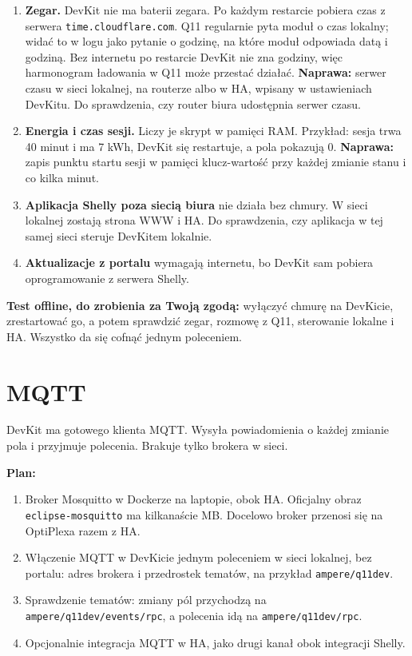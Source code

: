 \documentclass[11pt,a4paper]{article}
\begin{document}
\begin{enumerate}
\item \textbf{Zegar.} DevKit nie ma baterii zegara. Po każdym restarcie pobiera czas z serwera \texttt{time.\allowbreak{}cloudflare.\allowbreak{}com}. Q11 regularnie pyta moduł o czas lokalny; widać to w logu jako pytanie o godzinę, na które moduł odpowiada datą i godziną. Bez internetu po restarcie DevKit nie zna godziny, więc harmonogram ładowania w Q11 może przestać działać. \textbf{Naprawa:} serwer czasu w sieci lokalnej, na routerze albo w HA, wpisany w ustawieniach DevKitu. Do sprawdzenia, czy router biura udostępnia serwer czasu.
\item \textbf{Energia i czas sesji.} Liczy je skrypt w pamięci RAM. Przykład: sesja trwa 40 minut i ma 7 kWh, DevKit się restartuje, a pola pokazują 0. \textbf{Naprawa:} zapis punktu startu sesji w pamięci klucz-wartość przy każdej zmianie stanu i co kilka minut.
\item \textbf{Aplikacja Shelly poza siecią biura} nie działa bez chmury. W sieci lokalnej zostają strona WWW i HA. Do sprawdzenia, czy aplikacja w tej samej sieci steruje DevKitem lokalnie.
\item \textbf{Aktualizacje z portalu} wymagają internetu, bo DevKit sam pobiera oprogramowanie z serwera Shelly.
\end{enumerate}

\textbf{Test offline, do zrobienia za Twoją zgodą:} wyłączyć chmurę na DevKicie, zrestartować go, a potem sprawdzić zegar, rozmowę z Q11, sterowanie lokalne i HA. Wszystko da się cofnąć jednym poleceniem.


\clearpage

\section{MQTT}

DevKit ma gotowego klienta MQTT. Wysyła powiadomienia o każdej zmianie pola i przyjmuje polecenia. Brakuje tylko brokera w sieci.


\textbf{Plan:}

\begin{enumerate}
\item Broker Mosquitto w Dockerze na laptopie, obok HA. Oficjalny obraz \texttt{eclipse-\allowbreak{}mosquitto} ma kilkanaście MB. Docelowo broker przenosi się na OptiPlexa razem z HA.
\item Włączenie MQTT w DevKicie jednym poleceniem w sieci lokalnej, bez portalu: adres brokera i przedrostek tematów, na przykład \texttt{ampere/\allowbreak{}q11dev}.
\item Sprawdzenie tematów: zmiany pól przychodzą na \texttt{ampere/\allowbreak{}q11dev/\allowbreak{}events/\allowbreak{}rpc}, a polecenia idą na \texttt{ampere/\allowbreak{}q11dev/\allowbreak{}rpc}.
\item Opcjonalnie integracja MQTT w HA, jako drugi kanał obok integracji Shelly.
\end{enumerate}
\end{document}
